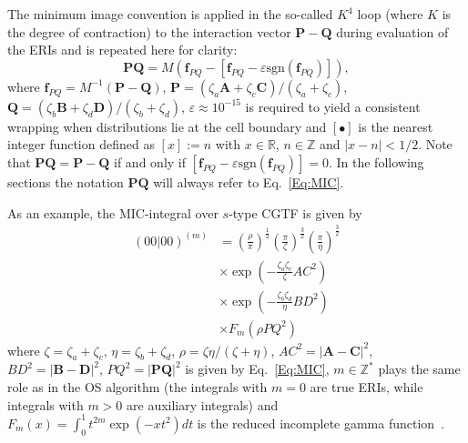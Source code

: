 \documentclass[prl,preprint,doublespace]{revtex4} %
\begin{document}
The minimum image convention is applied in the so-called $K^4$ loop 
(where $K$ is the degree of contraction)
to the interaction vector $\mathbf{P-Q}$ during evaluation of the ERIs and is 
repeated here for clarity: 
\begin{equation}\label{Eq:MIC}
  \mathbf{PQ}=M(\mathbf{f}_{PQ}-[\mathbf{f}_{PQ}-\varepsilon \mathrm{sgn}(\mathbf{f}_{PQ})]),
\end{equation}
where $\mathbf{f}_{PQ}=M^{-1}(\mathbf{P-Q})$, 
$\mathbf{P}=(\zeta_a\mathbf{A}+\zeta_c\mathbf{C})/(\zeta_a+\zeta_c)$, 
$\mathbf{Q}=(\zeta_b\mathbf{B}+\zeta_d\mathbf{D})/(\zeta_b+\zeta_d)$, 
$\varepsilon\approx 10^{-15}$ is 
required to yield a consistent wrapping when distributions lie at the cell boundary 
and $[\bullet]$ is the nearest integer function defined as 
$[x]:=n$ with $x\in \mathbb{R}$, $n\in \mathbb{Z}$ and $|x-n|<1/2$.
Note that $\mathbf{PQ}=\mathbf{P-Q}$ if and only if $[\mathbf{f}_{PQ}-\varepsilon\mathrm{sgn}(\mathbf{f}_{PQ})]=0$.
In the following sections the notation $\mathbf{PQ}$ will always refer to Eq.~\ref{Eq:MIC}.

As an example, the MIC-integral over $s$-type CGTF is given by
\begin{equation*}
  \begin{split}
  (00|00)^{(m)}&=\left(\frac{\rho}{\pi}\right)^{\frac{1}{2}}
    \left(\frac{\pi}{\zeta}\right)^{\frac{3}{2}}\left(\frac{\pi}{\eta}\right)^{\frac{3}{2}}\\
    &\times\exp\left(-\frac{\zeta_a\zeta_c}{\zeta}AC^2\right) \\
    &\times\exp\left(-\frac{\zeta_b\zeta_d}{\eta}BD^2\right) \\
    &\times F_{m}(\rho PQ^2)
  \end{split}
\end{equation*}
where $\zeta=\zeta_a+\zeta_c$, $\eta=\zeta_b+\zeta_d$, $\rho=\zeta\eta/(\zeta+\eta)$,
$AC^2=|\mathbf{A-C}|^2$, $BD^2=|\mathbf{B-D}|^2$, $PQ^2=|\mathbf{PQ}|^2$ 
is given by Eq.~\ref{Eq:MIC}, $m\in\mathbb{Z}^*$ plays %
the same role as in the OS algorithm (the integrals with $m=0$ are true ERIs, while
integrals with $m>0$ are auxiliary integrals)
and $F_m(x)=\int_0^1t^{2m}\exp(-xt^2)dt$ is the reduced incomplete gamma function~\cite{IShavitt63}.
\end{document}
